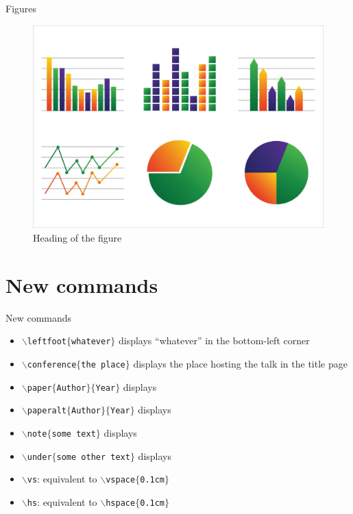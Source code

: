 \documentclass[numbertotal,blue,toc,wide]{bpslides}
\begin{document}
\begin{frame}{Figures}
\begin{figure}
\centering
\caption{Heading of the figure}
\includegraphics[width=0.9\paperheight]{graph}
\end{figure}
\end{frame}

\section{New commands}

\begin{frame}{New commands}
	\begin{itemize}
	\item \texttt{$\backslash$leftfoot$\{$whatever$\}$} displays ``whatever'' in the bottom-left corner
	\item \texttt{$\backslash$conference$\{$the place$\}$} displays the place hosting the talk in the title page
	\item \texttt{$\backslash$paper$\{$Author$\}\{$Year$\}$} displays 
	\item \texttt{$\backslash$paperalt$\{$Author$\}\{$Year$\}$} displays 
	\item \texttt{$\backslash$note$\{$some text$\}$} displays 
	\item \texttt{$\backslash$under$\{$some other text$\}$} displays 
	\item \texttt{$\backslash$vs}: equivalent to \texttt{$\backslash$vspace$\{$0.1cm$\}$}
	\item \texttt{$\backslash$hs}: equivalent to \texttt{$\backslash$hspace$\{$0.1cm$\}$}
	\end{itemize}
\end{frame}
\end{document}
